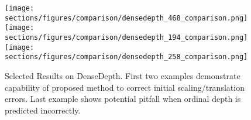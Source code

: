 \begin{figure*}
  \texttt{[image: sections/figures/comparison/densedepth\_468\_comparison.png]}
  \texttt{[image: sections/figures/comparison/densedepth\_194\_comparison.png]}
  \texttt{[image: sections/figures/comparison/densedepth\_258\_comparison.png]}
  \caption{Selected Results on DenseDepth. First two examples demonstrate
    capability of proposed method to correct initial scaling/translation errors.
    Last example shows potential pitfall when ordinal depth is predicted incorrectly.}
\end{figure*}



  


